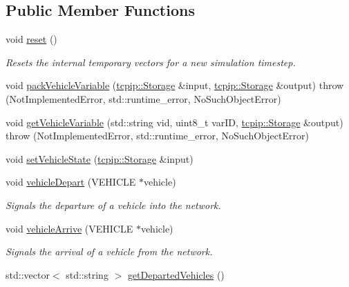 \subsection*{Public Member Functions}
\begin{DoxyCompactItemize}
\item 
void \hyperlink{classtraci__api_1_1_vehicle_manager_abbf990fe432a286e4d3889ff3b3491df}{reset} ()
\begin{DoxyCompactList}\small\item\em Resets the internal temporary vectors for a new simulation timestep. \end{DoxyCompactList}\item 
void \hyperlink{classtraci__api_1_1_vehicle_manager_a4b246d7f01b5f37679830f677328fc16}{pack\+Vehicle\+Variable} (\hyperlink{classtcpip_1_1_storage}{tcpip\+::\+Storage} \&input, \hyperlink{classtcpip_1_1_storage}{tcpip\+::\+Storage} \&output)  throw (\+Not\+Implemented\+Error, std\+::runtime\+\_\+error, No\+Such\+Object\+Error)
\item 
void \hyperlink{classtraci__api_1_1_vehicle_manager_a6926963a4f6914be50a1b75833574249}{get\+Vehicle\+Variable} (std\+::string vid, uint8\+\_\+t var\+ID, \hyperlink{classtcpip_1_1_storage}{tcpip\+::\+Storage} \&output)  throw (\+Not\+Implemented\+Error, std\+::runtime\+\_\+error, No\+Such\+Object\+Error)
\item 
void \hyperlink{classtraci__api_1_1_vehicle_manager_a7b3c7300d7b091527ed296652701c471}{set\+Vehicle\+State} (\hyperlink{classtcpip_1_1_storage}{tcpip\+::\+Storage} \&input)
\item 
void \hyperlink{classtraci__api_1_1_vehicle_manager_a6451b873f33f8a6713df294a81b78d3f}{vehicle\+Depart} (V\+E\+H\+I\+C\+LE $\ast$vehicle)
\begin{DoxyCompactList}\small\item\em Signals the departure of a vehicle into the network. \end{DoxyCompactList}\item 
void \hyperlink{classtraci__api_1_1_vehicle_manager_a336d2616be8e4e0c9da5d29d7f122ad6}{vehicle\+Arrive} (V\+E\+H\+I\+C\+LE $\ast$vehicle)
\begin{DoxyCompactList}\small\item\em Signals the arrival of a vehicle from the network. \end{DoxyCompactList}\item 
std\+::vector$<$ std\+::string $>$ \hyperlink{classtraci__api_1_1_vehicle_manager_ae88de975fe459842df9a412c552641ea}{get\+Departed\+Vehicles} ()

\end{DoxyCompactItemize}
